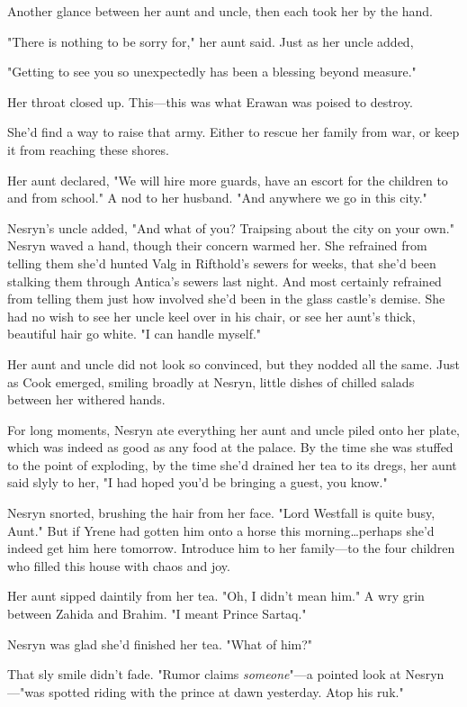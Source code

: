 Another glance between her aunt and uncle, then each took her by the hand.

"There is nothing to be sorry for," her aunt said.
Just as her uncle added,

"Getting to see you so unexpectedly has been a blessing beyond measure."

Her throat closed up.
This---this was what Erawan was poised to destroy.

She'd find a way to raise that army.
Either to rescue her family from war, or keep it from reaching these shores.

Her aunt declared, "We will hire more guards, have an escort for the children to and from school."
A nod to her husband.
"And anywhere we go in this city."

Nesryn's uncle added, "And what of you?
Traipsing about the city on your own."
Nesryn waved a hand, though their concern warmed her.
She refrained from telling them she'd hunted Valg in Rifthold's sewers for weeks, that she'd been stalking them through Antica's sewers last night.
And most certainly refrained from telling them just how involved she'd been in the glass castle's demise.
She had no wish to see her uncle keel over in his chair, or see her aunt's thick, beautiful hair go white.
"I can handle myself."

Her aunt and uncle did not look so convinced, but they nodded all the same.
Just as Cook emerged, smiling broadly at Nesryn, little dishes of chilled salads between her withered hands.

For long moments, Nesryn ate everything her aunt and uncle piled onto her plate, which was indeed as good as any food at the palace.
By the time she was stuffed to the point of exploding, by the time she'd drained her tea to its dregs, her aunt said slyly to her, "I had hoped you'd be bringing a guest, you know."

Nesryn snorted, brushing the hair from her face.
"Lord Westfall is quite busy, Aunt."
But if Yrene had gotten him onto a horse this morning\ldots perhaps she'd indeed get him here tomorrow.
Introduce him to her family---to the four children who filled this house with chaos and joy.

Her aunt sipped daintily from her tea.
"Oh, I didn't mean him."
A wry grin between Zahida and Brahim.
"I meant Prince Sartaq."

Nesryn was glad she'd finished her tea.
"What of him?"

That sly smile didn't fade.
"Rumor claims \emph{someone}"---a pointed look at Nesryn---"was spotted riding with the prince at dawn yesterday.
Atop his ruk."

